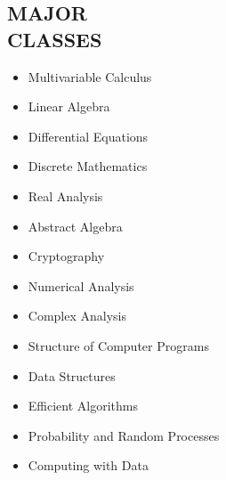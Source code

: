 \documentclass[margin]{res}
\begin{document}
\begin{resume}
\section{MAJOR \\ CLASSES}             
               \begin{multicols}{2}
	       \begin{itemize}\itemsep -2pt
		\item Multivariable Calculus\\
 		\item Linear Algebra 
		\item Differential Equations\\
		\item Discrete Mathematics\\
                \item Real Analysis\\
                \item Abstract Algebra\\
		\item Cryptography\\
		\item Numerical Analysis\\
                \item Complex Analysis\\
                \item Structure of Computer Programs\\
		\item Data Structures\\
                \item Efficient Algorithms\\
		\item Probability and Random Processes\\
                \item Computing with Data\\
		\end{itemize}
	       \end{multicols}

\end{resume}
\end{document}
